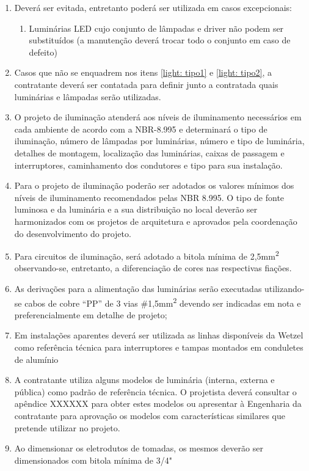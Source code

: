 \begin{enumerate}
	\item Deverá ser evitada, entretanto poderá ser utilizada em casos excepcionais:\label{light: tipo2}
	\begin{enumerate} 
		
		\item Luminárias LED cujo conjunto de lâmpadas e driver não podem ser substituídos (a manutenção deverá trocar todo o conjunto em caso de defeito)		
	\end{enumerate}

	\item Casos que não se enquadrem nos itens \ref{light: tipo1} e \ref{light: tipo2}, a contratante deverá ser contatada para definir junto a contratada quais luminárias e lâmpadas serão utilizadas.

	
	\item O projeto de iluminação atenderá aos níveis de iluminamento necessários em cada ambiente de acordo com a NBR-8.995 e determinará o tipo de iluminação, número de lâmpadas por luminárias, número e tipo de luminária, detalhes de montagem, localização das luminárias, caixas de passagem e interruptores, caminhamento dos condutores e tipo para sua instalação. 
	
	\item Para o projeto de iluminação poderão ser adotados os valores mínimos dos níveis de iluminamento recomendados pelas NBR 8.995. O tipo de fonte luminosa e da luminária e a sua distribuição no local deverão ser harmonizados com os projetos de arquitetura e aprovados pela coordenação do desenvolvimento do projeto.
	
	\item \label{lighting: bitola minima} Para circuitos de iluminação, será adotado a bitola mínima de 2,5mm\textsuperscript{2} observando-se, entretanto, a diferenciação de cores nas respectivas fiações.
	
	\item As derivações para a alimentação das luminárias serão executadas utilizando-se cabos de cobre “PP” de 3 vias \#1,5mm\textsuperscript{2} devendo ser indicadas em nota e preferencialmente em detalhe de projeto;
	
	\item Em instalações aparentes deverá ser utilizada as linhas disponíveis da Wetzel como referência técnica para interruptores e tampas montados em conduletes de alumínio
	
	\item A contratante utiliza alguns modelos de luminária (interna, externa e pública) como padrão de referência técnica. O projetista deverá consultar o apêndice XXXXXX para obter estes modelos ou apresentar à Engenharia da contratante para aprovação os modelos com características similares que pretende utilizar no projeto.
	
	\item Ao dimensionar os eletrodutos de tomadas, os mesmos deverão ser dimensionados com bitola mínima de 3/4"%
\end{enumerate}